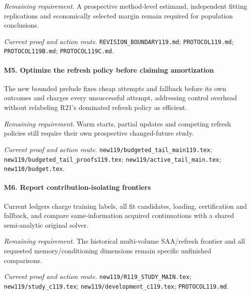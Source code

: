 \par\emph{Remaining requirement.} A prospective method-level estimand, independent fitting replications and economically selected margin remain required for population conclusions.

\par\emph{Current proof and action route.} \nolinkurl{REVISION_BOUNDARY119.md}; \nolinkurl{PROTOCOL119.md}; \nolinkurl{PROTOCOL119B.md}; \nolinkurl{PROTOCOL119C.md}.

\paragraph{M5. Optimize the refresh policy before claiming amortization}

The new bounded prelude fixes cheap attempts and fallback before its own outcomes and charges every unsuccessful attempt, addressing control overhead without relabeling R21's dominated refresh policy as efficient.

\par\emph{Remaining requirement.} Warm starts, partial updates and competing refresh policies still require their own prospective changed-future study.

\par\emph{Current proof and action route.} \nolinkurl{new119/budgeted_tail_main119.tex}; \nolinkurl{new119/budgeted_tail_proofs119.tex}; \nolinkurl{new119/active_tail_main.tex}; \nolinkurl{new110/budget.tex}.

\paragraph{M6. Report contribution-isolating frontiers}

Current ledgers charge training labels, all fit candidates, loading, certification and fallback, and compare same-information acquired continuations with a shared semi-analytic original solver.

\par\emph{Remaining requirement.} The historical multi-volume SAA/\allowbreak{}refresh frontier and all requested memory/\allowbreak{}conditioning dimensions remain specific unfinished comparisons.

\par\emph{Current proof and action route.} \nolinkurl{new119/R119_STUDY_MAIN.tex}; \nolinkurl{new119/study_c119.tex}; \nolinkurl{new119/development_c119.tex}; \nolinkurl{PROTOCOL119.md}.

